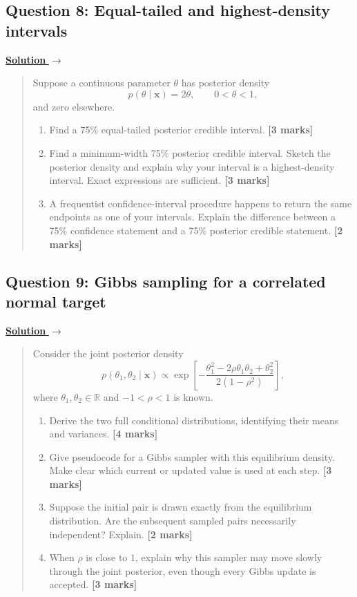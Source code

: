 \documentclass[11pt,a4paper]{article}
\newcommand{\given}{\mathrel{|}}
\newcommand{\xvec}{\boldsymbol{x}}
\newenvironment{examquestion}[2]
  {\subsection{#1}\label{question:\arabic{subsection}}\label{#2}%
   \noindent\hyperref[answer:\arabic{subsection}]{\textbf{Solution} $\rightarrow$}%
   \begin{quote}\color{statgrey}}
  {\end{quote}}
\begin{document}
\clearpage

\begin{examquestion}{Question 8: Equal-tailed and highest-density intervals}{question:practice-equal-tailed-and-highest-density-intervals}
Suppose a continuous parameter $\theta$ has posterior density
\[
  p(\theta\given\xvec)=2\theta,
  \qquad 0<\theta<1,
\]
and zero elsewhere.

\begin{enumerate}[label=(\alph*)]
  \item Find a 75\% equal-tailed posterior credible interval.
        \textbf{[3 marks]}

  \item Find a minimum-width 75\% posterior credible interval. Sketch the
        posterior density and explain why your interval is a highest-density
        interval. Exact expressions are sufficient. \textbf{[3 marks]}

  \item A frequentist confidence-interval procedure happens to return the
        same endpoints as one of your intervals. Explain the difference
        between a 75\% confidence statement and a 75\% posterior credible
        statement. \textbf{[2 marks]}
\end{enumerate}
\end{examquestion}

\clearpage

\begin{examquestion}{Question 9: Gibbs sampling for a correlated normal target}{question:practice-gibbs-sampling-for-a-correlated-normal-target}
Consider the joint posterior density
\[
  p(\theta_1,\theta_2\given\xvec)
  \propto
  \exp\left[
    -\frac{\theta_1^2-2\rho\theta_1\theta_2+\theta_2^2}
           {2(1-\rho^2)}
  \right],
\]
where $\theta_1,\theta_2\in\mathbb{R}$ and $-1<\rho<1$ is known.

\begin{enumerate}[label=(\alph*)]
  \item Derive the two full conditional distributions, identifying their
        means and variances. \textbf{[4 marks]}

  \item Give pseudocode for a Gibbs sampler with this equilibrium density.
        Make clear which current or updated value is used at each step.
        \textbf{[3 marks]}

  \item Suppose the initial pair is drawn exactly from the equilibrium
        distribution. Are the subsequent sampled pairs necessarily
        independent? Explain. \textbf{[2 marks]}

  \item When $\rho$ is close to $1$, explain why this sampler may move slowly
        through the joint posterior, even though every Gibbs update is
        accepted. \textbf{[3 marks]}
\end{enumerate}
\end{examquestion}
\end{document}
